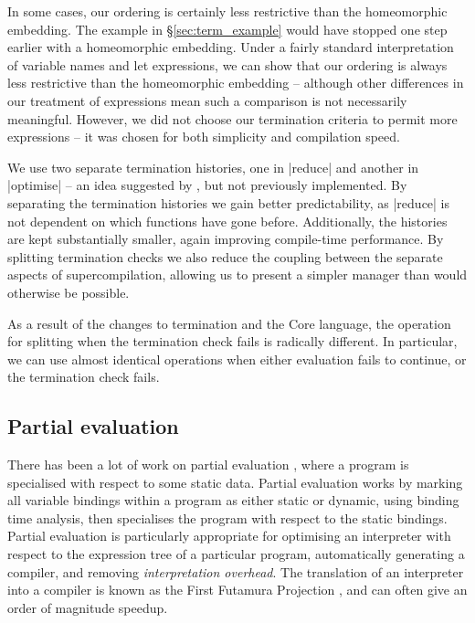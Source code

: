 \documentclass[draft]{sigplanconf}
\begin{document}
In some cases, our ordering is certainly less restrictive than the homeomorphic embedding. The example in \S\ref{sec:term_example} would have stopped one step earlier with a homeomorphic embedding. Under a fairly standard interpretation of variable names and let expressions, we can show that our ordering is always less restrictive than the homeomorphic embedding -- although other differences in our treatment of expressions mean such a comparison is not necessarily meaningful. However, we did not choose our termination criteria to permit more expressions -- it was chosen for both simplicity and compilation speed.

We use two separate termination histories, one in |reduce| and another in |optimise| -- an idea suggested by \citet{me:thesis}, but not previously implemented. By separating the termination histories we gain better predictability, as |reduce| is not dependent on which functions have gone before. Additionally, the histories are kept substantially smaller, again improving compile-time performance. By splitting termination checks we also reduce the coupling between the separate aspects of supercompilation, allowing us to present a simpler manager than would otherwise be possible.

As a result of the changes to termination and the Core language, the operation for splitting when the termination check fails is radically different. In particular, we can use almost identical operations when either evaluation fails to continue, or the termination check fails.

\subsection{Partial evaluation}

There has been a lot of work on partial evaluation \cite{jones:partial_evaluation}, where a program is specialised with respect to some static data. Partial evaluation works by marking all variable bindings within a program as either static or dynamic, using binding time analysis, then specialises the program with respect to the static bindings. Partial evaluation is particularly appropriate for optimising an interpreter with respect to the expression tree of a particular program, automatically generating a compiler, and removing \textit{interpretation overhead}. The translation of an interpreter into a compiler is known as the First Futamura Projection \cite{futanama:projections}, and can often give an order of magnitude speedup.
\end{document}
